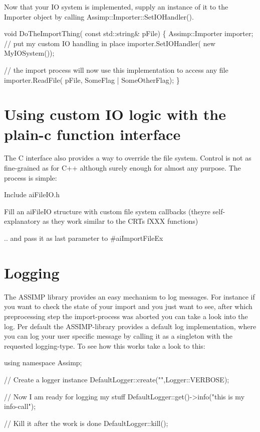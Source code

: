 Now that your I\+O system is implemented, supply an instance of it to the Importer object by calling Assimp\+::\+Importer\+::\+Set\+I\+O\+Handler().


\begin{DoxyCode}
\textcolor{keywordtype}{void} DoTheImportThing( \textcolor{keyword}{const} std::string& pFile)
\{
  Assimp::Importer importer;
  \textcolor{comment}{// put my custom IO handling in place}
  importer.SetIOHandler( \textcolor{keyword}{new} MyIOSystem());

  \textcolor{comment}{// the import process will now use this implementation to access any file}
  importer.ReadFile( pFile, SomeFlag | SomeOtherFlag);
\}
\end{DoxyCode}
\hypertarget{usage_custom_io_c}{}\section{Using custom I\+O logic with the plain-\/c function interface}\label{usage_custom_io_c}
The C interface also provides a way to override the file system. Control is not as fine-\/grained as for C++ although surely enough for almost any purpose. The process is simple\+:


\begin{DoxyItemize}
\item Include ai\+File\+I\+O.\+h 
\item Fill an ai\+File\+I\+O structure with custom file system callbacks (they\textquotesingle{}re self-\/explanatory as they work similar to the C\+R\+T\textquotesingle{}s f\+X\+X\+X functions) 
\item .. and pass it as last parameter to \#ai\+Import\+File\+Ex 
\end{DoxyItemize}\hypertarget{usage_logging}{}\section{Logging}\label{usage_logging}
The A\+S\+S\+I\+M\+P library provides an easy mechanism to log messages. For instance if you want to check the state of your import and you just want to see, after which preprocessing step the import-\/process was aborted you can take a look into the log. Per default the A\+S\+S\+I\+M\+P-\/library provides a default log implementation, where you can log your user specific message by calling it as a singleton with the requested logging-\/type. To see how this works take a look to this\+:


\begin{DoxyCode}
\textcolor{keyword}{using namespace }Assimp;

\textcolor{comment}{// Create a logger instance }
DefaultLogger::create(\textcolor{stringliteral}{""},Logger::VERBOSE);

\textcolor{comment}{// Now I am ready for logging my stuff}
DefaultLogger::get()->info(\textcolor{stringliteral}{"this is my info-call"});

\textcolor{comment}{// Kill it after the work is done}
DefaultLogger::kill();
\end{DoxyCode}


